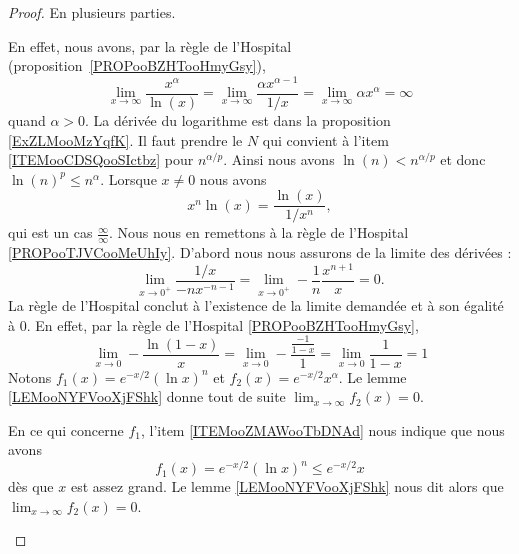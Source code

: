 \begin{proof}
	En plusieurs parties.
	\begin{subproof}
		En effet, nous avons, par la règle de l'Hospital (proposition~\ref{PROPooBZHTooHmyGsy}),
		\begin{equation}
			\lim_{x\to\infty} \frac{ x^{\alpha} }{ \ln(x) }=\lim_{x\to\infty} \frac{ \alpha x^{\alpha-1} }{ 1/x }=\lim_{x\to\infty} \alpha x^{\alpha}=\infty
		\end{equation}
		quand \( \alpha>0\). La dérivée du logarithme est dans la proposition \ref{ExZLMooMzYqfK}.
		Il faut prendre le \( N\) qui convient à l'item \ref{ITEMooCDSQooSIctbz} pour \( n^{\alpha/p}\). Ainsi nous avons \( \ln(n)<n^{\alpha/p}\) et donc \( \ln(n)^p\leq n^{\alpha}\).
		Lorsque \( x\neq 0\) nous avons
		\begin{equation}
			x^n\ln(x)=\frac{ \ln(x) }{ 1/x^n },
		\end{equation}
		qui est un cas \( \frac{ \infty }{ \infty }\). Nous nous en remettons à la règle de l'Hospital \ref{PROPooTJVCooMeUhIy}. D'abord nous nous assurons de la limite des dérivées :
		\begin{equation}
			\lim_{x\to 0^+} \frac{ 1/x }{ -nx^{-n-1} }=\lim_{x\to 0^+} -\frac{1}{ n }\frac{ x^{n+1} }{ x }=0.
		\end{equation}
		La règle de l'Hospital conclut à l'existence de la limite demandée et à son égalité à \( 0\).
		En effet, par la règle de l'Hospital \ref{PROPooBZHTooHmyGsy},
		\begin{equation}    \label{EqGICpOX}
			\lim_{x\to 0} -\frac{ \ln(1-x) }{ x }=\lim_{x\to 0} -\frac{ \frac{ -1 }{ 1-x } }{ 1 }=\lim_{x\to 0} \frac{1}{ 1-x }=1
		\end{equation}
		Notons \( f_1(x)= e^{-x/2}(\ln x)^n\) et \( f_2(x)= e^{-x/2}x^{\alpha}\). Le lemme \ref{LEMooNYFVooXjFShk} donne tout de suite \( \lim_{x\to \infty} f_2(x)=0\).

		En ce qui concerne \( f_1\), l'item \ref{ITEMooZMAWooTbDNAd} nous indique que nous avons
		\begin{equation}
			f_1(x)= e^{-x/2}(\ln x)^n\leq  e^{-x/2}x
		\end{equation}
		dès que \( x\) est assez grand. Le lemme \ref{LEMooNYFVooXjFShk} nous dit alors que \( \lim_{x\to \infty} f_2(x)=0\).


\end{subproof}
\end{proof}
